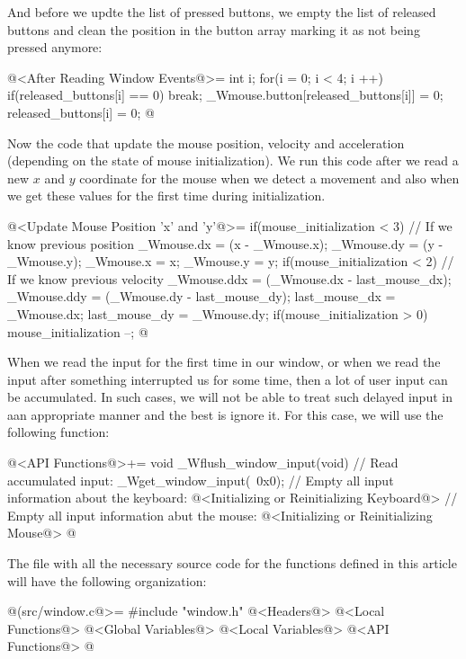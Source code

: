 And before we updte the list of pressed buttons, we empty the list of
released buttons and clean the position in the button array marking it
as not being pressed anymore:

\iniciocodigo
@<After Reading Window Events@>=
{
  int i;
  for(i = 0; i < 4; i ++){
    if(released_buttons[i] == 0)
      break;
    _Wmouse.button[released_buttons[i]] = 0;
    released_buttons[i] = 0;
  }
}
@
\fimcodigo

Now the code that update the mouse position, velocity and acceleration
(depending on the state of mouse initialization). We run this code
after we read a new $x$ and $y$ coordinate for the mouse when we
detect a movement and also when we get these values for the first time
during initialization.

\iniciocodigo
@<Update Mouse Position 'x' and 'y'@>=
{
  if(mouse_initialization < 3){ // If we know previous position
    _Wmouse.dx = (x - _Wmouse.x);
    _Wmouse.dy = (y - _Wmouse.y);
  }
  _Wmouse.x = x;
  _Wmouse.y = y;
  if(mouse_initialization < 2){ // If we know previous velocity
    _Wmouse.ddx = (_Wmouse.dx - last_mouse_dx);
    _Wmouse.ddy = (_Wmouse.dy - last_mouse_dy);
  }
  last_mouse_dx = _Wmouse.dx;
  last_mouse_dy = _Wmouse.dy;
  if(mouse_initialization > 0)
    mouse_initialization --;
}
@
\fimcodigo


When we read the input for the first time in our window, or when we
read the input after something interrupted us for some time, then a
lot of user input can be accumulated. In such cases, we will not be
able to treat such delayed input in aan appropriate manner and the
best is ignore it. For this case, we will use the following function:

\iniciocodigo
@<API Functions@>+=
void _Wflush_window_input(void){
  // Read accumulated input:
  _Wget_window_input(~0x0);
  // Empty all input information about the keyboard:
  @<Initializing or Reinitializing Keyboard@>
  // Empty all input information abut the mouse:
  @<Initializing or Reinitializing Mouse@>
}
@
\fimcodigo



The file with all the necessary source code for the functions defined
in this article will have the following organization:

\iniciocodigo
@(src/window.c@>=
#include "window.h"
@<Headers@>
@<Local Functions@>
@<Global Variables@>
@<Local Variables@>
@<API Functions@>
@
\fimcodigo


\fim
